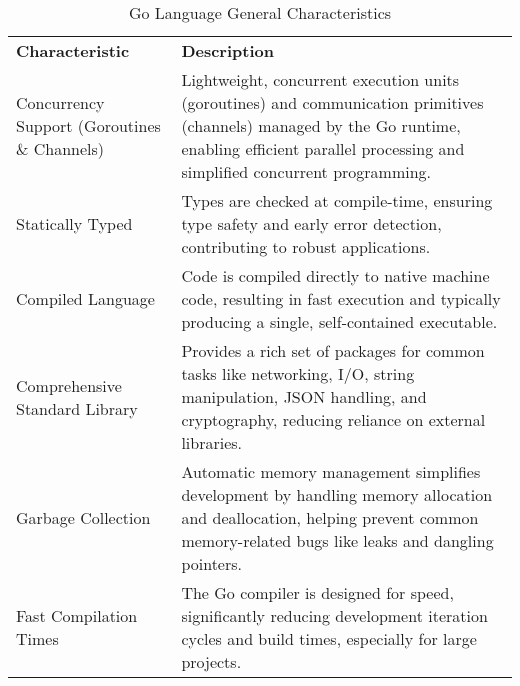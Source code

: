 \begin{table}[h]
	\centering
	\caption{Go Language General Characteristics}
	\label{tab:go_characteristics}
	\begin{tabular}{>{\raggedright\arraybackslash}p{} >{\raggedright\arraybackslash}p{}}
		\toprule
		\multicolumn{2}{c}{\textbf{General Characteristics}} \\
		\midrule
		\textbf{Characteristic}                      & \textbf{Description}\\
		\midrule
		Concurrency Support (Goroutines \& Channels) & Lightweight, concurrent execution units (goroutines) and communication primitives (channels) managed by the Go runtime, enabling efficient parallel processing and simplified concurrent programming. \\
		\addlinespace
		Statically Typed                             & Types are checked at compile-time, ensuring type safety and early error detection, contributing to robust applications. \\
		\addlinespace
		Compiled Language                            & Code is compiled directly to native machine code, resulting in fast execution and typically producing a single, self-contained executable. \\
		\addlinespace
		Comprehensive Standard Library               & Provides a rich set of packages for common tasks like networking, I/O, string manipulation, JSON handling, and cryptography, reducing reliance on external libraries. \\
		\addlinespace
		Garbage Collection                           & Automatic memory management simplifies development by handling memory allocation and deallocation, helping prevent common memory-related bugs like leaks and dangling pointers. \\
		\addlinespace
		Fast Compilation Times                       & The Go compiler is designed for speed, significantly reducing development iteration cycles and build times, especially for large projects.\\
		\midrule
	\end{tabular}
\end{table}

